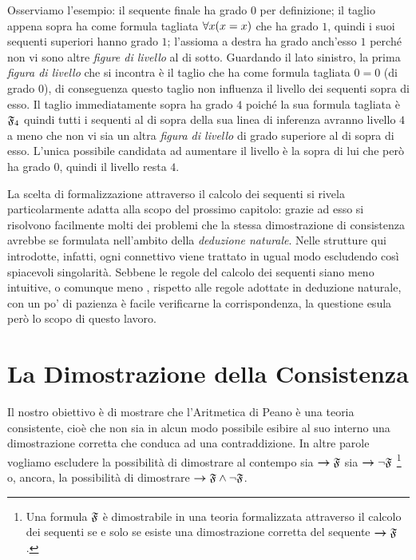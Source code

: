 		Osserviamo l'esempio: il sequente finale ha grado $0$ per definizione; il taglio appena sopra ha come formula tagliata $\forall x(x=x)$ che ha grado $1$, quindi i suoi sequenti superiori hanno grado $1$; l'assioma a destra ha grado anch'esso $1$ perché non vi sono altre \emph{figure di livello} al di sotto. Guardando il lato sinistro, la prima \emph{figura di livello} che si incontra è il taglio che ha come formula tagliata $0=0$ (di grado $0$), di conseguenza questo taglio non influenza il livello dei sequenti sopra di esso. Il taglio immediatamente sopra ha grado $4$ poiché la sua formula tagliata è $\mathfrak{F}_{4}$ quindi tutti i sequenti al di sopra della sua linea di inferenza avranno livello $4$ a meno che non vi sia un altra \emph{figura di livello} di grado superiore al di sopra di esso. L'unica possibile candidata ad aumentare il livello è la  sopra di lui che però ha grado $0$, quindi il livello resta $4$.
		
		La scelta di formalizzazione attraverso il calcolo dei sequenti si rivela particolarmente adatta alla scopo del prossimo capitolo: grazie ad esso si risolvono facilmente molti dei problemi che la stessa dimostrazione di consistenza avrebbe se formulata nell'ambito della \emph{deduzione naturale}. Nelle strutture qui introdotte, infatti, ogni connettivo viene trattato in ugual modo escludendo così spiacevoli singolarità. Sebbene le regole del calcolo dei sequenti siano meno intuitive, o comunque meno , rispetto alle regole adottate in deduzione naturale, con un po' di pazienza è facile verificarne la corrispondenza, la questione esula però lo scopo di questo lavoro.
		
\chapter{La Dimostrazione della Consistenza} %
		Il nostro obiettivo è di mostrare che l'Aritmetica di Peano è una teoria consistente, cioè che non sia in alcun modo possibile esibire al suo interno una dimostrazione corretta che conduca ad una contraddizione. In altre parole vogliamo escludere la possibilità di dimostrare al contempo sia $\bm{\rightarrow} \mathfrak{F}$ sia $\bm{\rightarrow} \neg\mathfrak{F}$ \footnote{Una formula $\mathfrak{F}$ è dimostrabile in una teoria formalizzata attraverso il calcolo dei sequenti se e solo se esiste una dimostrazione corretta del sequente $\bm{\rightarrow} \mathfrak{F}$.} o, ancora, la possibilità di dimostrare $\bm{\rightarrow} \mathfrak{F} \land \neg\mathfrak{F}$.
		
